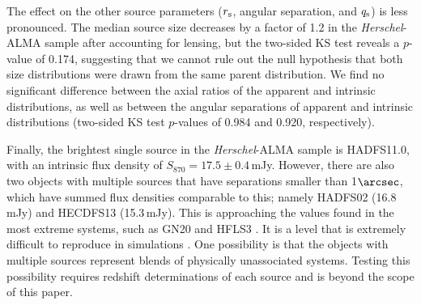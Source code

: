\documentclass[iop]{emulateapj}
\begin{document}
The effect on the other source parameters ($r_{\rm s}$, angular separation, and
$q_{\rm s}$) is less pronounced.  The median source size decreases by a factor
of 1.2 in the {\it Herschel}-ALMA sample after accounting for lensing, but the
two-sided KS test reveals a $p$-value of 0.174, suggesting that we cannot rule
out the null hypothesis that both size distributions were drawn from the same
parent distribution.  We find no significant difference between the axial
ratios of the apparent and intrinsic distributions, as well as between the
angular separations of apparent and intrinsic distributions (two-sided KS test
$p$-values of 0.984 and 0.920, respectively). 


Finally, the brightest single source in the {\it Herschel}-ALMA sample is
HADFS11.0, with an intrinsic flux density of $S_{870} = 17.5 \pm
0.4\,$mJy.  However, there are also two objects with multiple sources that
have separations smaller than 1$\arcsec$, which have summed flux densities
comparable to this; namely HADFS02 (16.8$\,$mJy) and HECDFS13 (15.3$\,$mJy).  This is
approaching the values found in the most extreme systems, such as GN20
\citep[20.6$\,$mJy,][]{2006MNRAS.370.1185P} and HFLS3
\citep[15-20$\,$mJy;][]{Riechers:2013lr, Cooray:2014rm, Robson:2014xy}.  It is
a level that is extremely difficult to reproduce in simulations
\citep[e.g.,][]{Narayanan:2010lr}.  One possibility is that the objects with
multiple sources represent blends of physically unassociated systems.  Testing
this possibility requires redshift determinations of each source and is beyond
the scope of this paper.
\end{document}
